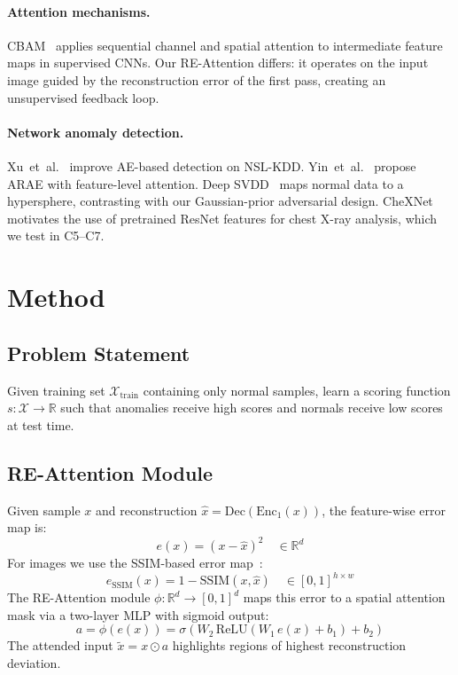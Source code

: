 \documentclass[11pt,a4paper]{article}
\begin{document}
\paragraph{Attention mechanisms.}
CBAM~\cite{woo_cbam_2018} applies sequential channel and spatial attention to
intermediate feature maps in supervised CNNs.
Our RE-Attention differs: it operates on the input image guided by the reconstruction
error of the first pass, creating an unsupervised feedback loop.

\paragraph{Network anomaly detection.}
Xu~et~al.~\cite{improving_ae_nslkdd_2021} improve AE-based detection on NSL-KDD.
Yin~et~al.~\cite{arae_network_2025} propose ARAE with feature-level attention.
Deep SVDD~\cite{ruff_deepsvdd_2018} maps normal data to a hypersphere, contrasting
with our Gaussian-prior adversarial design.
CheXNet~\cite{rajpurkar_chexnet_2017} motivates the use of pretrained ResNet
features for chest X-ray analysis, which we test in C5--C7.

\section{Method}

\subsection{Problem Statement}

Given training set $\mathcal{X}_{\mathrm{train}}$ containing only normal samples,
learn a scoring function $s:\mathcal{X}\to\mathbb{R}$ such that anomalies receive
high scores and normals receive low scores at test time.

\subsection{RE-Attention Module}

Given sample $x$ and reconstruction $\hat{x}=\mathrm{Dec}(\mathrm{Enc}_1(x))$,
the feature-wise error map is:
\begin{equation}
  e(x) = (x - \hat{x})^2 \quad\in\mathbb{R}^d
\end{equation}
For images we use the SSIM-based error map~\cite{wang_ssim_2004}:
\begin{equation}
  e_{\mathrm{SSIM}}(x) = 1 - \mathrm{SSIM}(x,\hat{x}) \quad\in[0,1]^{h\times w}
\end{equation}
The RE-Attention module $\phi:\mathbb{R}^d\to[0,1]^d$ maps this error to a spatial
attention mask via a two-layer MLP with sigmoid output:
\begin{equation}
  a = \phi(e(x)) = \sigma\!\left(W_2\,\mathrm{ReLU}(W_1\,e(x)+b_1)+b_2\right)
\end{equation}
The attended input $\tilde{x} = x \odot a$ highlights regions of highest
reconstruction deviation.
\end{document}
